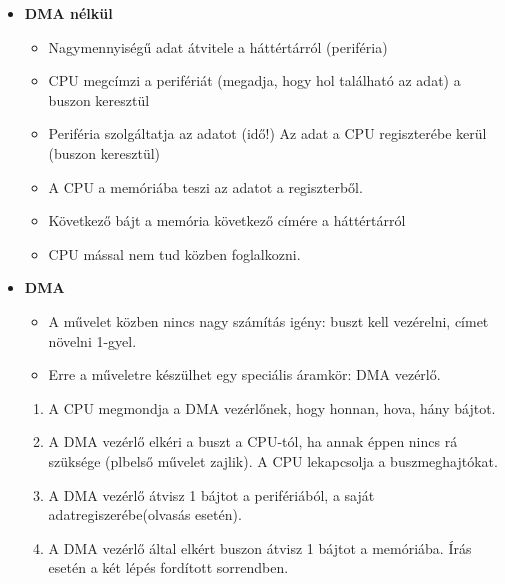 \documentclass[11pt,a4paper]{article}
\begin{document}
            \begin{tcolorbox}[colback=blue!5!white,colframe=blue!50!black,title= 15. Ismertesse a periféria csatolási módszereket{,} módszerenként kitérve az adott módszer előnyére{,} és hátrányára! Part 2.]
                \begin{itemize}
                    \item \textbf{DMA nélkül}
                    \begin{itemize}
                        \item  Nagymennyiségű adat átvitele a háttértárról (periféria)
                        \item CPU megcímzi a perifériát (megadja, hogy hol található az adat) a buszon keresztül
                        \item Periféria szolgáltatja az adatot (idő!) Az adat a CPU regiszterébe kerül (buszon keresztül)
                        \item A CPU a memóriába teszi az adatot a regiszterből.
                        \item Következő bájt a memória következő címére a háttértárról
                        \item CPU mással nem tud közben foglalkozni.
                    \end{itemize}
                    \item \textbf{DMA}
                    \begin{itemize}
                        \item A művelet közben nincs nagy számítás igény: buszt kell vezérelni, címet növelni 1-gyel.
                        \item Erre a műveletre készülhet egy speciális áramkör: DMA vezérlő.
                    \end{itemize}
                    \begin{enumerate}
                        \item A CPU megmondja a DMA vezérlőnek, hogy honnan, hova, hány bájtot.
                        \item A DMA vezérlő elkéri a buszt a CPU-tól, ha annak éppen nincs rá szüksége (plbelső művelet zajlik). A CPU lekapcsolja a buszmeghajtókat.
                        \item A DMA vezérlő átvisz 1 bájtot a perifériából, a saját adatregiszerébe(olvasás esetén).
                        \item A DMA vezérlő által elkért buszon átvisz 1 bájtot a memóriába. Írás esetén a két lépés fordított sorrendben.

\end{enumerate}
\end{itemize}
\end{tcolorbox}
\end{document}
